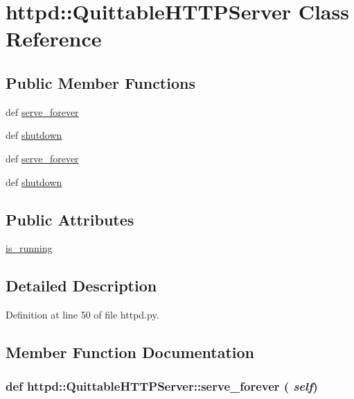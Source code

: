 \hypertarget{classhttpd_1_1_quittable_h_t_t_p_server}{
\section{httpd::QuittableHTTPServer Class Reference}
\label{classhttpd_1_1_quittable_h_t_t_p_server}
}
\subsection*{Public Member Functions}
\begin{DoxyCompactItemize}
\item 
def \hyperlink{classhttpd_1_1_quittable_h_t_t_p_server_ad7da0003b17805e7e629fa09a3a8f187}{serve\_\-forever}
\item 
def \hyperlink{classhttpd_1_1_quittable_h_t_t_p_server_a7d527531f10ecbcb1db670cf816bbcbd}{shutdown}
\item 
def \hyperlink{classhttpd_1_1_quittable_h_t_t_p_server_ad7da0003b17805e7e629fa09a3a8f187}{serve\_\-forever}
\item 
def \hyperlink{classhttpd_1_1_quittable_h_t_t_p_server_a7d527531f10ecbcb1db670cf816bbcbd}{shutdown}
\end{DoxyCompactItemize}
\subsection*{Public Attributes}
\begin{DoxyCompactItemize}
\item 
\hyperlink{classhttpd_1_1_quittable_h_t_t_p_server_a72e565dcba798dfd43d18268e92075a8}{is\_\-running}
\end{DoxyCompactItemize}


\subsection{Detailed Description}


Definition at line 50 of file httpd.py.



\subsection{Member Function Documentation}
\hypertarget{classhttpd_1_1_quittable_h_t_t_p_server_ad7da0003b17805e7e629fa09a3a8f187}{
\subsubsection[{serve\_\-forever}]{\setlength{\rightskip}{0pt plus 5cm}def httpd::QuittableHTTPServer::serve\_\-forever ( {\em self})}}
\label{classhttpd_1_1_quittable_h_t_t_p_server_ad7da0003b17805e7e629fa09a3a8f187}


